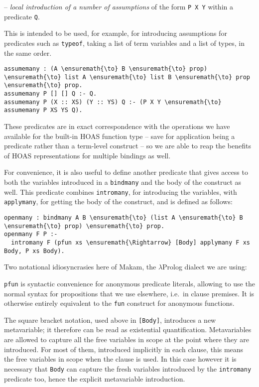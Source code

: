 -- \emph{local introduction of a number of assumptions} of the form
\texttt{P\ X\ Y} within a predicate \texttt{Q}.

This is intended to be used, for example, for introducing assumptions
for predicates such as \texttt{typeof}, taking a list of term variables
and a list of types, in the same order.

\begin{verbatim}
assumemany : (A \ensuremath{\to} B \ensuremath{\to} prop) \ensuremath{\to} list A \ensuremath{\to} list B \ensuremath{\to} prop \ensuremath{\to} prop.
assumemany P [] [] Q :- Q.
assumemany P (X :: XS) (Y :: YS) Q :- (P X Y \ensuremath{\to} assumemany P XS YS Q).
\end{verbatim}

These predicates are in exact correspondence with the operations we have
available for the built-in HOAS function type -- save for application
being a predicate rather than a term-level construct -- so we are able
to reap the benefits of HOAS representations for multiple bindings as
well.

For convenience, it is also useful to define another predicate that
gives access to both the variables introduced in a \texttt{bindmany} and
the body of the construct as well. This predicate combines
\texttt{intromany}, for introducing the variables, with
\texttt{applymany}, for getting the body of the construct, and is
defined as follows:

\begin{verbatim}
openmany : bindmany A B \ensuremath{\to} (list A \ensuremath{\to} B \ensuremath{\to} prop) \ensuremath{\to} prop.
openmany F P :-
  intromany F (pfun xs \ensuremath{\Rightarrow} [Body] applymany F xs Body, P xs Body).
\end{verbatim}

Two notational idiosyncrasies here of Makam, the \ensuremath{\lambda}Prolog dialect we are
using:

\texttt{pfun} is syntactic convenience for anonymous predicate literals,
allowing to use the normal syntax for propositions that we use
elsewhere, i.e.~in clause premises. It is otherwise entirely equivalent
to the \texttt{fun} construct for anonymous functions.

The square bracket notation, used above in \texttt{{[}Body{]}},
introduces a new metavariable; it therefore can be read as existential
quantification. Metavariables are allowed to capture all the free
variables in scope at the point where they are introduced. For most of
them, introduced implicitly in each clause, this means the free
variables in scope when the clause is used. In this case however it is
necessary that \texttt{Body} can capture the fresh variables introduced
by the \texttt{intromany} predicate too, hence the explicit metavariable
introduction.

